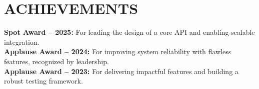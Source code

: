 \documentclass[]{deedy-resume-openfont}
\begin{document}
\begin{minipage}[t]{0.33\textwidth}
\section{ACHIEVEMENTS}

\href{https://shivasanthosh.github.io/aboutme/#achievements}{} \textbf{Spot Award – 2025:} For leading the design of a core API and enabling scalable integration. \\

\href{https://shivasanthosh.github.io/aboutme/#achievements}{}  \textbf{Applause Award – 2024:} For improving system reliability with flawless features, recognized by leadership.  \\

\href{https://shivasanthosh.github.io/aboutme/#achievements}{}  \textbf{Applause Award – 2023:} For delivering impactful features and building a robust testing framework.






%
%

\end{minipage} 
\hfill
\end{document}
